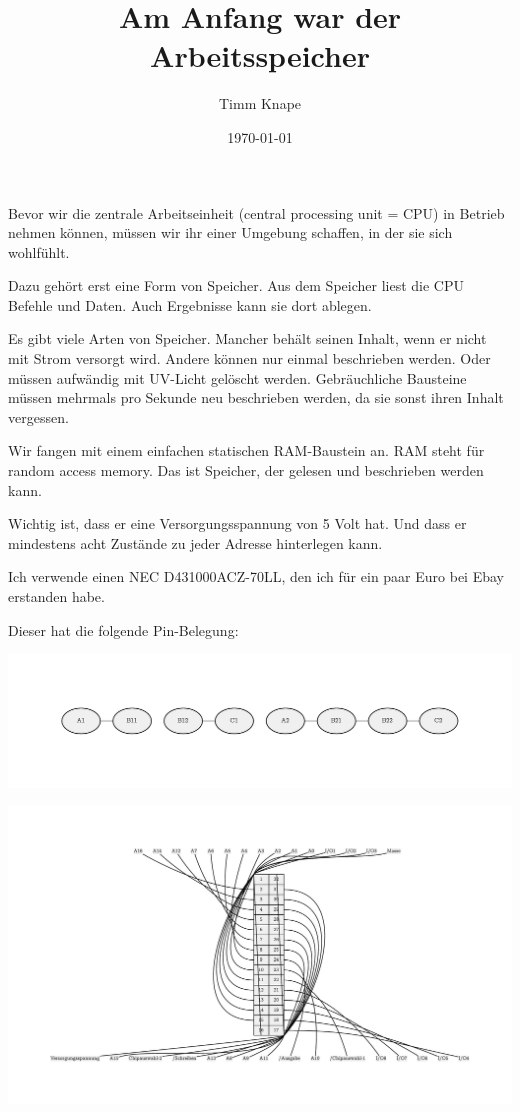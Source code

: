 \documentclass[a5paper,ngerman]{article}
\title{\color{emph}Am Anfang war der Arbeitsspeicher}
\author{Timm Knape}
\date{\today}
\begin{document}
\pagecolor{background}
\color{normal}
\allsectionsfont{\color{emph}\mdseries}
\pagestyle{plain}
\maketitle
\thispagestyle{fancy}

Bevor wir die zentrale Arbeitseinheit (central processing unit = CPU)
in Betrieb nehmen können,
müssen wir ihr einer Umgebung schaffen, in der sie sich wohlfühlt.

Dazu gehört erst eine Form von Speicher.
Aus dem Speicher liest die CPU Befehle und Daten.
Auch Ergebnisse kann sie dort ablegen.

Es gibt viele Arten von Speicher.
Mancher behält seinen Inhalt, wenn er nicht mit Strom versorgt wird.
Andere können nur einmal beschrieben werden.
Oder müssen aufwändig mit UV-Licht gelöscht werden.
Gebräuchliche Bausteine müssen mehrmals pro Sekunde neu beschrieben
werden, da sie sonst ihren Inhalt vergessen.

Wir fangen mit einem einfachen statischen RAM-Baustein an.
RAM steht für random access memory.
Das ist Speicher, der gelesen und beschrieben werden kann.

Wichtig ist, dass er eine Versorgungsspannung von 5 Volt hat.
Und dass er mindestens acht Zustände zu jeder Adresse hinterlegen kann.

Ich verwende einen NEC D431000ACZ-70LL, den ich für ein paar Euro bei
Ebay erstanden habe.

Dieser hat die folgende Pin-Belegung:

\centerline{\includegraphics[trim={1in .9in 1in .9in},clip]{imgs/dot-1.pdf}}

\centerline{\includegraphics[trim={1in .9in 1in .9in},clip]{imgs/dot-2.pdf}}
\end{document}
